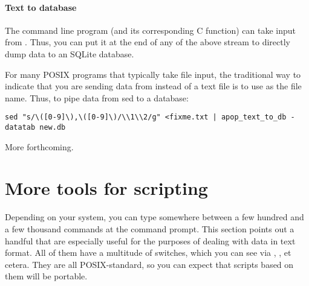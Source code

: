 \paragraph{Text to database}
The  command line program (and its corresponding
C function) can take input from . Thus, you can put it at the end of
any of the above stream to directly dump data to an SQLite database.

For many POSIX programs that typically take file input, the traditional
way to indicate that you are sending data from  instead of a text
file is to use \bi{-} as the file name. Thus, to pipe data from sed to a
database:
\begin{lstlisting}
sed "s/\([0-9]\),\([0-9]\)/\\1\\2/g" <fixme.txt | apop_text_to_db - datatab new.db
\end{lstlisting}

 
More forthcoming.



\section{More tools for scripting}
Depending on your system, you can type somewhere between a few hundred
and a few thousand commands at the command prompt. This section points
out a handful that are especially useful for the purposes of dealing
with data in text format.  All of them have a multitude of switches,
which you can see via ,  , et cetera. They are
all POSIX-standard, so you can expect that scripts based on them will be portable.

